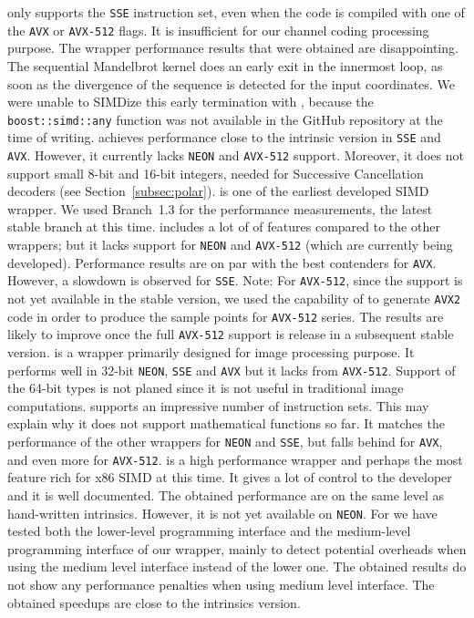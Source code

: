 \textbf{\BoostSIMD} only supports the \verb|SSE| instruction set, even when the
code is compiled with one of the \verb|AVX| or \verb|AVX-512| flags. It is
insufficient for our channel coding processing purpose. The \BoostSIMD wrapper
performance results that were obtained are disappointing. The sequential
Mandelbrot kernel does an early exit in the innermost loop, as soon as the
divergence of the sequence is detected for the input coordinates. We were unable
to SIMDize this early termination with \BoostSIMD, because the
\verb|boost::simd::any| function was not available in the GitHub repository at
the time of writing.
\textbf{\xsimd} achieves performance close to the intrinsic version in
\verb|SSE| and \verb|AVX|. However, it currently lacks \verb|NEON| and
\verb|AVX-512| support. Moreover, it does not support small 8-bit and 16-bit
integers, needed for Successive Cancellation decoders (see
Section~\ref{subsec:polar}).
\textbf{\Vc} is one of the earliest developed SIMD \Cxx wrapper. We used
Branch~1.3 for the performance measurements, the latest stable branch at this
time. \Vc includes a lot of of features compared to the other wrappers; but it
lacks support for \verb|NEON| and \verb|AVX-512| (which are currently being
developed). Performance results are on par with the best contenders for
\verb|AVX|. However, a slowdown is observed for \verb|SSE|. Note: For
\verb|AVX-512|, since the support is not yet available in the stable version, we
used the capability of \Vc to generate \verb|AVX2| code in order to produce the
sample points for \verb|AVX-512| series. The results are likely to improve once
the full \verb|AVX-512| support is release in a subsequent stable version.
\textbf{\TSIMD} is a wrapper primarily designed for image processing purpose.
It performs well in 32-bit \verb|NEON|, \verb|SSE| and \verb|AVX| but it lacks
from \verb|AVX-512|. Support of the 64-bit types is not planed since it is not
useful in traditional image computations.
\textbf{\simdpp} supports an impressive number of instruction sets. This may
explain why it does not support mathematical functions so far. It matches the
performance of the other wrappers for \verb|NEON| and \verb|SSE|, but falls
behind for \verb|AVX|, and even more for \verb|AVX-512|.
\textbf{\VCL} is a high performance wrapper and perhaps the most feature rich
for x86 SIMD at this time. It gives a lot of control to the developer and it is
well documented. The obtained performance are on the same level as hand-written
intrinsics. However, it is not yet available on \verb|NEON|.
For \MIPP we have tested both the lower-level programming
interface and the medium-level programming interface of our \MIPP wrapper,
mainly to detect potential overheads when using the medium level interface
instead of the lower one. The obtained results do not show any performance
penalties when using \MIPP medium level interface. The obtained speedups are
close to the intrinsics version.

